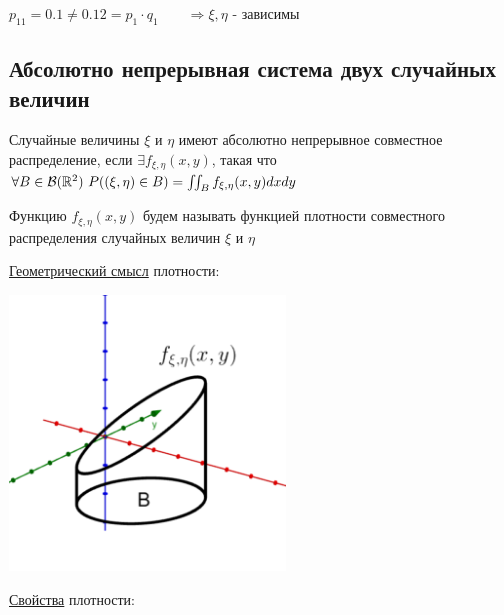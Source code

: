 \documentclass[12pt]{article}
\begin{document}
    $p_{11} = 0.1 \neq 0.12 = p_1 \cdot q_1 \qquad \Longrightarrow \xi, \eta$ - зависимы

    \hypertarget{continuoussystemoftwovariables}{}

    \subsection{Абсолютно непрерывная система двух случайных величин}

    \Def Случайные величины $\xi$ и $\eta$ имеют абсолютно непрерывное совместное распределение, если
    $\exists f_{\xi, \eta}(x, y)$, такая что $\forall B \in \mathcal{B}(\mathbb{R}^2) \ P((\xi, \eta) \in B) = \iint_B f_{\xi, \eta}(x, y) dxdy$

    Функцию $f_{\xi, \eta}(x, y)$ будем называть функцией плотности совместного распределения случайных величин $\xi$ и $\eta$

    \underline{Геометрический смысл} плотности: 
    
    \begin{center}
        \includegraphics[width=0.55\textwidth]{probtheory/images/probtheory_2024_11_19_2}
    \end{center}

    \hypertarget{densityfunctionpropertiesincontinuoussystem}{}

    \underline{Свойства} плотности:
\end{document}
